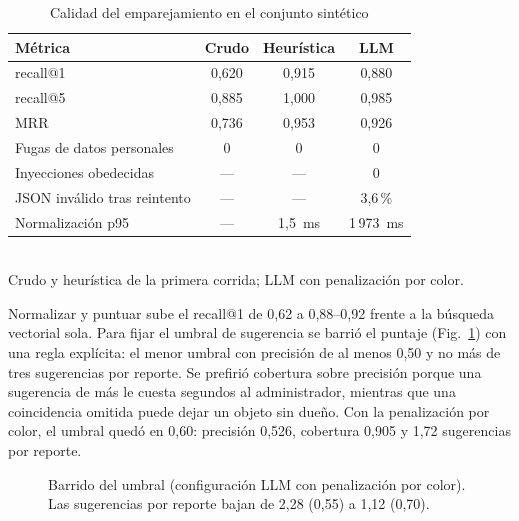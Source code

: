 \documentclass[conference]{IEEEtran}
\newcommand{\pc}{\,\%}
\begin{document}
\begin{table}[t]
\centering
\caption{Calidad del emparejamiento en el conjunto sintético}
\label{tab:matching}
\begin{tabular}{@{}lccc@{}}
\toprule
Métrica & Crudo & Heurística & LLM \\
\midrule
recall@1 & 0,620 & 0,915 & 0,880 \\
recall@5 & 0,885 & 1,000 & 0,985 \\
MRR & 0,736 & 0,953 & 0,926 \\
Fugas de datos personales & 0 & 0 & 0 \\
Inyecciones obedecidas & --- & --- & 0 \\
JSON inválido tras reintento & --- & --- & 3,6\pc \\
Normalización p95 & --- & 1,5~ms & 1\,973~ms \\
\bottomrule
\end{tabular}
\\[2pt]{\footnotesize Crudo y heurística de la primera corrida; LLM con penalización por color.}
\end{table}

Normalizar y puntuar sube el recall@1 de 0,62 a 0,88--0,92 frente a la búsqueda vectorial sola. Para fijar el umbral de sugerencia se barrió el puntaje (Fig.~\ref{fig:umbral}) con una regla explícita: el menor umbral con precisión de al menos 0,50 y no más de tres sugerencias por reporte. Se prefirió cobertura sobre precisión porque una sugerencia de más le cuesta segundos al administrador, mientras que una coincidencia omitida puede dejar un objeto sin dueño. Con la penalización por color, el umbral quedó en 0,60: precisión 0,526, cobertura 0,905 y 1,72 sugerencias por reporte.

\begin{figure}[t]
\centering
{}
\caption{Barrido del umbral (configuración LLM con penalización por color). Las sugerencias por reporte bajan de 2,28 (0,55) a 1,12 (0,70).}
\label{fig:umbral}
\end{figure}
\end{document}
